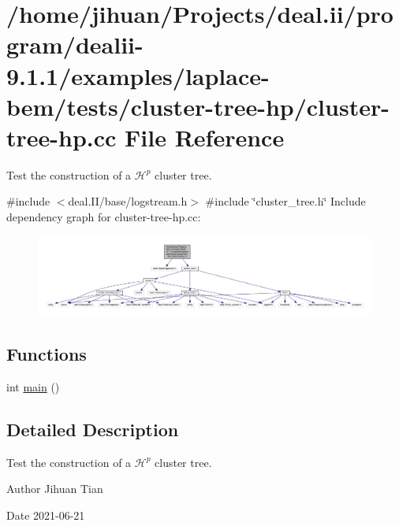 \hypertarget{cluster-tree-hp_8cc}{}\section{/home/jihuan/\+Projects/deal.ii/program/dealii-\/9.1.1/examples/laplace-\/bem/tests/cluster-\/tree-\/hp/cluster-\/tree-\/hp.cc File Reference}
\label{cluster-tree-hp_8cc}


Test the construction of a $\mathcal{H}^p$ cluster tree.  


{\ttfamily \#include $<$deal.\+I\+I/base/logstream.\+h$>$}\newline
{\ttfamily \#include \char`\"{}cluster\+\_\+tree.\+h\char`\"{}}\newline
Include dependency graph for cluster-\/tree-\/hp.cc\+:\nopagebreak
\begin{figure}[H]
\begin{center}
\leavevmode
\includegraphics[width=350pt]{cluster-tree-hp_8cc__incl}
\end{center}
\end{figure}
\subsection*{Functions}
\begin{DoxyCompactItemize}
\item 
int \hyperlink{cluster-tree-hp_8cc_ae66f6b31b5ad750f1fe042a706a4e3d4}{main} ()
\end{DoxyCompactItemize}


\subsection{Detailed Description}
Test the construction of a $\mathcal{H}^p$ cluster tree. 

\begin{DoxyAuthor}{Author}
Jihuan Tian 
\end{DoxyAuthor}
\begin{DoxyDate}{Date}
2021-\/06-\/21 
\end{DoxyDate}


